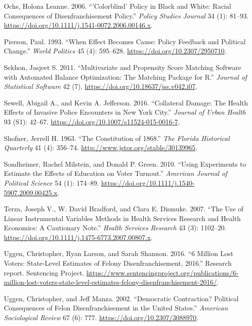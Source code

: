 \documentclass[]{article}
\begin{document}
\leavevmode\hypertarget{ref-Ochs2006}{}%
Ochs, Holona Leanne. 2006. ``'Colorblind' Policy in Black and White: Racial Consequences of Disenfranchisement Policy.'' \emph{Policy Studies Journal} 34 (1): 81--93. \url{https://doi.org/10.1111/j.1541-0072.2006.00146.x}.

\leavevmode\hypertarget{ref-Pierson1993}{}%
Pierson, Paul. 1993. ``When Effect Becomes Cause: Policy Feedback and Political Change.'' \emph{World Politics} 45 (4): 595--628. \url{https://doi.org/10.2307/2950710}.

\leavevmode\hypertarget{ref-Sekhon2011}{}%
Sekhon, Jasjeet S. 2011. ``Multivariate and Propensity Score Matching Software with Automated Balance Optimization: The Matching Package for R.'' \emph{Journal of Statistical Software} 42 (7). \url{https://doi.org/10.18637/jss.v042.i07}.

\leavevmode\hypertarget{ref-Sewell2016}{}%
Sewell, Abigail A., and Kevin A. Jefferson. 2016. ``Collateral Damage: The Health Effects of Invasive Police Encounters in New York City.'' \emph{Journal of Urban Health} 93 (S1): 42--67. \url{https://doi.org/10.1007/s11524-015-0016-7}.

\leavevmode\hypertarget{ref-florida_1868}{}%
Shofner, Jerrell H. 1963. ``The Constitution of 1868.'' \emph{The Florida Historical Quarterly} 41 (4): 356--74. \url{http://www.jstor.org/stable/30139965}.

\leavevmode\hypertarget{ref-Sondheimer2010}{}%
Sondheimer, Rachel Milstein, and Donald P. Green. 2010. ``Using Experiments to Estimate the Effects of Education on Voter Turnout.'' \emph{American Journal of Political Science} 54 (1): 174--89. \url{https://doi.org/10.1111/j.1540-5907.2009.00425.x}.

\leavevmode\hypertarget{ref-Terza2007}{}%
Terza, Joseph V., W. David Bradford, and Clara E. Dismuke. 2007. ``The Use of Linear Instrumental Variables Methods in Health Services Research and Health Economics: A Cautionary Note.'' \emph{Health Services Research} 43 (3): 1102--20. \url{https://doi.org/10.1111/j.1475-6773.2007.00807.x}.

\leavevmode\hypertarget{ref-sentencing_2016}{}%
Uggen, Christopher, Ryan Larson, and Sarah Shannon. 2016. ``6 Million Lost Voters: State-Level Estimates of Felony Disenfranchisement, 2016.'' Research report. Sentencing Project. \url{https://www.sentencingproject.org/publications/6-million-lost-voters-state-level-estimates-felony-disenfranchisement-2016/}.

\leavevmode\hypertarget{ref-Uggen2002}{}%
Uggen, Christopher, and Jeff Manza. 2002. ``Democratic Contraction? Political Consequences of Felon Disenfranchisement in the United States.'' \emph{American Sociological Review} 67 (6): 777. \url{https://doi.org/10.2307/3088970}.
\end{document}

